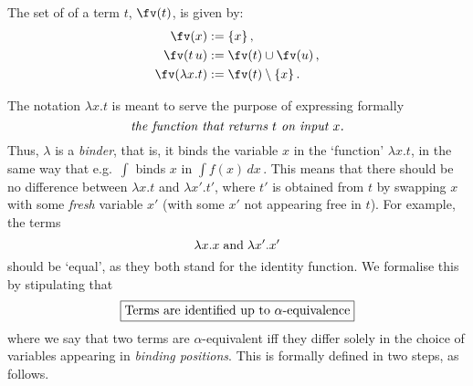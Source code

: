 \documentclass[12pt]{article}
\begin{document}
\begin{mydefinition}\label{d:fv}
The set of  of a term $t$, $\fv(t)$, is given by:
\begin{align*}
\fv(x)  &:= \{ x \}\,, \\
\fv(t\,u) &:= \fv(t)\cup\fv(u)\,, \\
\fv(\lambda x.t) &:= \fv(t)\setminus\{x\}\,.
\end{align*}\deq[-1]
\end{mydefinition}
%
The notation $\lambda x.t$ is meant to serve the purpose of expressing formally
\[ \emph{the function that returns $t$ on input $x$.} \]
Thus, $\lambda$ is a \emph{binder}, that is, it binds the variable $x$ in the `function' $\lambda x.t$, in the same way that e.g.~$\int$ binds $x$ in
$\int f(x)\,dx$\,.
%
This means that there should be no difference between $\lambda x.t$ and $\lambda x'.t'$, where $t'$ is obtained from $t$ by swapping $x$ with some
\emph{fresh} variable $x'$ (\ie with some $x'$ not appearing free in $t$). For example, the terms
\[ \lambda x.x \text{\;and\;} \lambda x'.x' \]
should be `equal', as they both stand for the identity function. We formalise this by stipulating that
\[\fbox{\text{Terms are identified up to $\alpha$-equivalence}} \]
where we say that two terms are $\alpha$-equivalent iff they differ solely in the choice of variables appearing in \emph{binding positions}.
This is formally defined in two steps, as follows.
\end{document}
